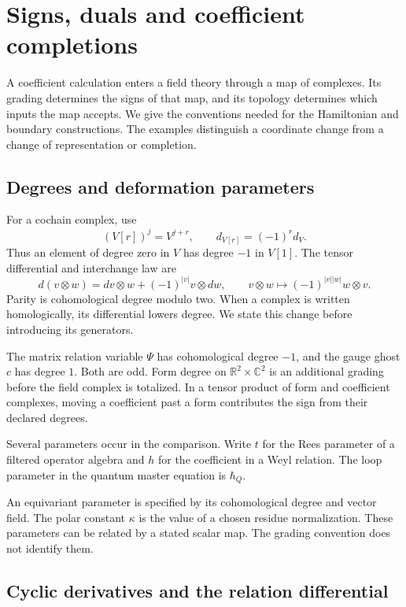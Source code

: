 \chapter{Signs, duals and coefficient completions}
\label{mht:ch:signs-duals}

A coefficient calculation enters a field theory through a map of
complexes. Its grading determines the signs of that map, and its
topology determines which inputs the map accepts. We give the
conventions needed for the Hamiltonian and boundary constructions.
The examples distinguish a coordinate change from a change of
representation or completion.

\section{Degrees and deformation parameters}

For a cochain complex, use
\[
 (V[r])^j=V^{j+r},\qquad
 d_{V[r]}=(-1)^r d_V.
\]
Thus an element of degree zero in $V$ has degree $-1$ in $V[1]$.
The tensor differential and interchange law are
\[
 d(v\otimes w)=dv\otimes w+(-1)^{|v|}v\otimes dw,
 \qquad
 v\otimes w\longmapsto(-1)^{|v||w|}w\otimes v.
\]
Parity is cohomological degree modulo two. When a complex is written
homologically, its differential lowers degree. We state this change
before introducing its generators.

The matrix relation variable $\Psi$ has cohomological degree $-1$,
and the gauge ghost $c$ has degree $1$. Both are odd. Form degree
on $\mathbb R^2\times\mathbb C^2$ is an additional grading before
the field complex is totalized. In a tensor product of form and
coefficient complexes, moving a coefficient past a form contributes
the sign from their declared degrees.

Several parameters occur in the comparison. Write $t$ for the Rees
parameter of a filtered operator algebra and $h$ for the coefficient
in a Weyl relation. The loop parameter in the quantum master
equation is $\hbar_Q$.

An equivariant parameter is specified by its
cohomological degree and vector field. The polar constant $\kappa$
is the value of a chosen residue normalization. These parameters
can be related by a stated scalar map. The grading convention
does not identify them.

\section{Cyclic derivatives and the relation differential}

